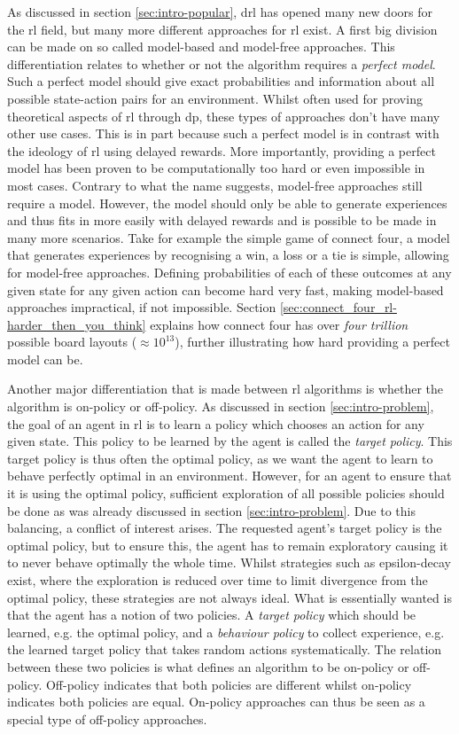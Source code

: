 As discussed in section \ref{sec:intro-popular}, \gls{drl} has opened many new doors for the \gls{rl} field, but many more different approaches for \gls{rl} exist.
A first big division can be made on so called model-based and model-free approaches.
This differentiation relates to whether or not the algorithm requires a \textit{perfect model}.
Such a perfect model should give exact probabilities and information about all possible state-action pairs for an environment.
Whilst often used for proving theoretical aspects of \gls{rl} through \gls{dp}, these types of approaches don't have many other use cases.
This is in part because such a perfect model is in contrast with the ideology of \gls{rl} using delayed rewards.
More importantly, providing a perfect model has been proven to be computationally too hard or even impossible in most cases.
Contrary to what the name suggests, model-free approaches still require a model.
However, the model should only be able to generate experiences and thus fits in more easily with delayed rewards and is possible to be made in many more scenarios.
Take for example the simple game of connect four, a model that generates experiences by recognising a win, a loss or a tie is simple, allowing for model-free approaches.
Defining probabilities of each of these outcomes at any given state for any given action can become hard very fast, making model-based approaches impractical, if not impossible.
Section \ref{sec:connect_four_rl-harder_then_you_think} explains how connect four has over \textit{four trillion} possible board layouts ($\approx 10^{13}$), further illustrating how hard providing a perfect model can be.

Another major differentiation that is made between \gls{rl} algorithms is whether the algorithm is on-policy or off-policy.
As discussed in section \ref{sec:intro-problem}, the goal of an agent in \gls{rl} is to learn a policy which chooses an action for any given state.
This policy to be learned by the agent is called the \textit{target policy}.
This target policy is thus often the optimal policy, as we want the agent to learn to behave perfectly optimal in an environment.
However, for an agent to ensure that it is using the optimal policy, sufficient exploration of all possible policies should be done as was already discussed in section \ref{sec:intro-problem}.
Due to this balancing, a conflict of interest arises.
The requested agent's target policy is the optimal policy, but to ensure this, the agent has to remain exploratory causing it to never behave optimally the whole time.
Whilst strategies such as epsilon-decay exist, where the exploration is reduced over time to limit divergence from the optimal policy, these strategies are not always ideal.
What is essentially wanted is that the agent has a notion of two policies.
A \textit{target policy} which should be learned, e.g. the optimal policy, and a \textit{behaviour policy} to collect experience, e.g. the learned target policy that takes random actions systematically.
The relation between these two policies is what defines an algorithm to be on-policy or off-policy.
Off-policy indicates that both policies are different whilst on-policy indicates both policies are equal.
On-policy approaches can thus be seen as a special type of off-policy approaches.



